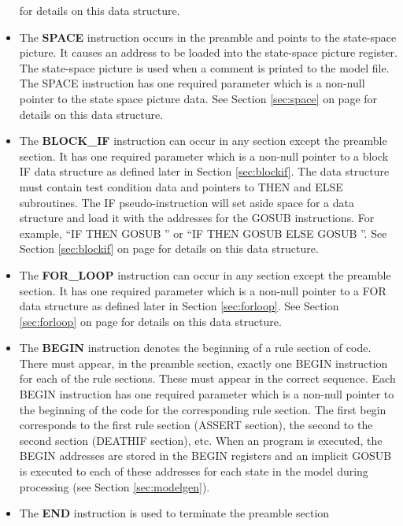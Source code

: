 \begin{itemize}
      for details on this data structure.
\item The {\bf SPACE} instruction occurs in the preamble and points to
      the state-space picture.   It causes an address to be loaded into
      the state-space picture register.   The state-space picture is
      used when a comment is printed to the model file.  The SPACE instruction
      has one required parameter which is a non-null pointer to the state
      space picture data.
      See Section \ref{sec:space} on page
      \pageref{sec:space}
      for details on this data structure.
\item The {\bf BLOCK\_IF} instruction can occur in any section except the
      preamble section.   It has
      one required parameter which is a non-null pointer to a block IF
      data structure as defined later in Section \ref{sec:blockif}.
      The data structure must contain test condition data and pointers
      to THEN and ELSE subroutines.  The IF pseudo-instruction
      will set aside space for a data structure and load it with the
      addresses for the GOSUB instructions.  For example,
      ``IF  THEN GOSUB '' or 
      ``IF  THEN GOSUB  ELSE GOSUB ''.
      See Section \ref{sec:blockif} on page \pageref{sec:blockif}
      for details on this data structure.
\item The {\bf FOR\_LOOP} instruction can occur in any section except the
      preamble section.   It has
      one required parameter which is a non-null pointer to a FOR
      data structure as defined later in Section \ref{sec:forloop}.
      See Section \ref{sec:forloop} on page \pageref{sec:forloop}
      for details on this data structure.
\item The {\bf BEGIN} instruction denotes the beginning of a rule section
      of code.   There must appear, in the preamble section, exactly one
      BEGIN instruction for each of the rule sections.   These must
      appear in the correct sequence.   Each BEGIN instruction has
      one required parameter which is a non-null pointer to the beginning
      of the code for the corresponding rule section.   The first begin
      corresponds to the first rule section (ASSERT section), the second
      to the second section (DEATHIF section), etc.   When an program is
      executed, the BEGIN addresses are stored in the BEGIN registers
      and an implicit GOSUB is executed to each of these addresses
      for each state in the model during processing (see
      Section \ref{sec:modelgen}).
\item The {\bf END} instruction is used to terminate the preamble section

\end{itemize}
